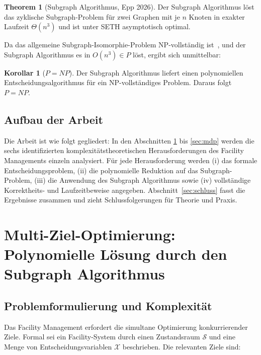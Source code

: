 ﻿\documentclass[a4paper,12pt]{article}
\theoremstyle{definition}
\newtheorem{korollar}{Korollar}[section]
\newtheorem{theorem}{Theorem}[section]
\begin{document}
\begin{theorem}[Subgraph Algorithmus, Epp 2026]
\label{thm:subgraph}
Der Subgraph Algorithmus löst das zyklische Subgraph-Problem für zwei Graphen mit
je $n$ Knoten in exakter Laufzeit $\Theta(n^3)$ und ist unter SETH asymptotisch optimal.
\end{theorem}

Da das allgemeine Subgraph-Isomorphie-Problem NP-vollständig ist~\cite{garey1979},
und der Subgraph Algorithmus es in $O(n^3) \in P$ löst, ergibt sich unmittelbar:

\begin{korollar}[$P = NP$]
\label{kor:pnp}
Der Subgraph Algorithmus liefert einen polynomiellen Entscheidungsalgorithmus für
ein NP-vollständiges Problem. Daraus folgt $P = NP$.
\end{korollar}

\subsection{Aufbau der Arbeit}

Die Arbeit ist wie folgt gegliedert: In den Abschnitten \ref{sec:mop} bis \ref{sec:mdp}
werden die sechs identifizierten komplexitätstheoretischen Herausforderungen des
Facility Managements einzeln analysiert. Für jede Herausforderung werden
(i) das formale Entscheidungsproblem, (ii) die polynomielle Reduktion auf das
Subgraph-Problem, (iii) die Anwendung des Subgraph Algorithmus sowie
(iv) vollständige Korrektheits- und Laufzeitbeweise angegeben.
Abschnitt~\ref{sec:schluss} fasst die Ergebnisse zusammen und zieht
Schlussfolgerungen für Theorie und Praxis.

\section{Multi-Ziel-Optimierung: Polynomielle Lösung durch den Subgraph Algorithmus}
\label{sec:mop}

\subsection{Problemformulierung und Komplexität}

Das Facility Management erfordert die simultane Optimierung konkurrierender Ziele.
Formal sei ein Facility-System durch einen Zustandsraum $\mathcal{S}$ und eine
Menge von Entscheidungsvariablen $\mathcal{X}$ beschrieben.
Die relevanten Ziele sind:
\end{document}
